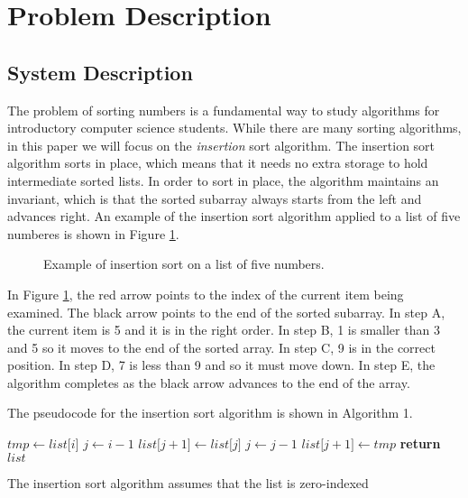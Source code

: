 \section{Problem Description} \label{sec:problem}


\subsection{System Description}

The problem of sorting numbers is a fundamental
way to study algorithms for introductory computer science
students. While there are many sorting algorithms, in this paper we
will focus on the \textit{insertion} sort algorithm. The insertion
sort algorithm sorts in place, which means that it needs no extra
storage to hold intermediate sorted lists. In order to sort in place,
the algorithm maintains an invariant, which is that the sorted
subarray always starts from the left and advances right. An example of
the insertion sort algorithm applied to a list of five numberes is
shown in Figure \ref{fig:insertsort}.

\begin{figure}[h]
  \caption{Example of insertion sort on a list of five numbers.}
  \label{fig:insertsort}
\end{figure}

In Figure \ref{fig:insertsort}, the red arrow points to the index of
the current item being examined. The black arrow points to the end of
the sorted subarray.  In step A, the current item is 5 and it is in
the right order. In step B, 1 is smaller than 3 and 5 so it moves to
the end of the sorted array. In step C, 9 is in the correct
position. In step D, 7 is less than 9 and so it must move down. In
step E, the algorithm completes as the black arrow advances to the end of the
array. 

The pseudocode for the insertion sort algorithm is shown in Algorithm 1. 

\begin{algorithm}
  \label{algo:insertsort}
  \begin{algorithmic}[1]
    \State $tmp \gets list \lbrack i \rbrack$
    \State $j \gets i - 1$
    \State $list \lbrack j+1 \rbrack \gets list \lbrack j \rbrack$
    \State $j \gets j - 1$
    \EndWhile
    \State $list \lbrack j+1 \rbrack \gets tmp$
    \EndFor
    \State \textbf{return} $list$
    \EndProcedure
  \end{algorithmic}
  \caption{The insertion sort algorithm assumes that the list is zero-indexed}  
\end{algorithm}



